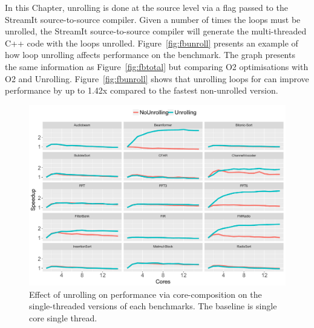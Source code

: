 In this Chapter, unrolling is done at the source level via a flag passed to the StreamIt source-to-source compiler.
Given a number of times the loops must be unrolled, the StreamIt source-to-source compiler will generate the multi-threaded C++ code with the loops unrolled.
Figure~\ref{fig:fbunroll} presents an example of how loop unrolling affects performance on the  benchmark.
The graph presents the same information as Figure~\ref{fig:fbtotal} but comparing O2 optimisations with O2 and Unrolling.
Figure~\ref{fig:fbunroll} shows that unrolling loops for  can improve performance by up to 1.42x compared to the fastest non-unrolled version.

\begin{figure}[t]
  \includegraphics[width=1\textwidth]{streamit-paper/graphics/unroll_speed_bars2.pdf}
  \caption{Effect of unrolling on performance via core-composition on the single-threaded versions of each benchmarks. The baseline is single core single thread.}\label{fig:unroll_summary}
  \vspace{-1em}
\end{figure}

